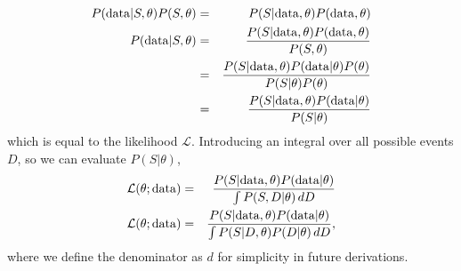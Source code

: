 \documentclass[a4paper,fleqn,usenatbib,manuscript]{emulateapj}
\begin{document}
\begin{eqnarray}
P({\rm data} | S , \theta) P(S, \theta) &=& P(S | {\rm data}, \theta) P({\rm data}, \theta)\\
P({\rm data} | S , \theta) &=& \frac{ P(S | {\rm data}, \theta) P({\rm data}, \theta) }{ P(S, \theta) }\\
&=& \frac{ P(S | {\rm data}, \theta) P({\rm data} | \theta) P(\theta)}{ P(S | \theta)  P(\theta)}\\
&=& \frac{ P(S | {\rm data}, \theta) P({\rm data} | \theta)}{ P(S | \theta) } \label{eq:general1}
\end{eqnarray}
which is equal to the likelihood $\mathcal{L}$. Introducing an integral over all possible events $D$, so we can evaluate $P(S|\theta)$, 
\begin{eqnarray}
\mathcal{L}(\theta; {\rm data})&=& \frac{P(S|{\rm data},\theta) P({\rm data}|\theta)}{\int P(S, D|\theta)\, dD} \\
\mathcal{L}(\theta; {\rm data}) &=& \frac{P(S|{\rm data},\theta) P({\rm data}|\theta)}{\int P(S | D, \theta) P(D|\theta)\, dD}, \label{eq:app_main}
\end{eqnarray}
where we define the denominator as $d$ for simplicity in future derivations.
\end{document}
